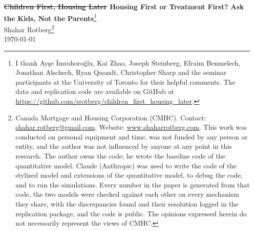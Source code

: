 \documentclass[10pt]{article}
\newcommand{\new}[1]{{\color{red}#1}}
\DeclareRobustCommand{\del}[1]{\sout{#1}}
\DeclareRobustCommand{\del}[1]{\sout{#1}}
\begin{document}
\begin{center}
\renewcommand{\thefootnote}{\fnsymbol{footnote}}
{\Large\bfseries \del{Children First, Housing Later} \new{Housing First or Treatment First? Ask the Kids, Not the Parents}}\footnote{I thank Ay\c{s}e \.{I}mrohoro\u{g}lu, Kai Zhao, Joseph Steinberg, Efraim Benmelech, Jonathan Alschech, Ryan Quandt, Christopher Sharp and the seminar participants at the University of Toronto for their helpful comments. The data and replication code are available on GitHub at \url{https://github.com/srotberg/children_first_housing_later}.}\\[0.6em]
{\large Shahar Rotberg}\footnote{Canada Mortgage and Housing Corporation (CMHC). Contact: \url{shahar.rotberg@gmail.com}. Website: \url{www.shaharrotberg.com}. This work was conducted on personal equipment and time, was not funded by any person or entity, and the author was not influenced by anyone at any point in this research. The author owns the code; he wrote the baseline code of the quantitative model. Claude (Anthropic) was used to write the code of the stylized model and extensions of the quantitative model, to debug the code, and to run the simulations. Every number in the paper is generated from that code, the two models were checked against each other on every mechanism they share, with the discrepancies found and their resolution logged in the replication package, and the code is public. The opinions expressed herein do not necessarily represent the views of CMHC.}\\[0.35em]
\today
\end{center}
\renewcommand{\thefootnote}{\arabic{footnote}}
\setcounter{footnote}{0}
\end{document}
